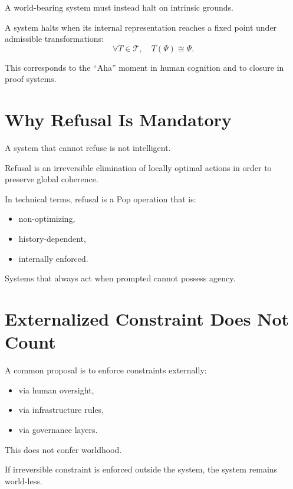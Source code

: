 \documentclass[11pt]{book}
\begin{document}
A world-bearing system must instead halt on intrinsic grounds.

\begin{definition}
A system halts when its internal representation reaches a fixed point
under admissible transformations:
\[
\forall T \in \mathcal{T}, \quad T(\Psi) \cong \Psi.
\]
\end{definition}

This corresponds to the ``Aha'' moment in human cognition and to closure
in proof systems.

\section{Why Refusal Is Mandatory}

A system that cannot refuse is not intelligent.

\begin{definition}[Refusal]
Refusal is an irreversible elimination of locally optimal actions in
order to preserve global coherence.
\end{definition}

In technical terms, refusal is a \textsf{Pop} operation that is:
\begin{itemize}
\item non-optimizing,
\item history-dependent,
\item internally enforced.
\end{itemize}

Systems that always act when prompted cannot possess agency.

\section{Externalized Constraint Does Not Count}

A common proposal is to enforce constraints externally:
\begin{itemize}
\item via human oversight,
\item via infrastructure rules,
\item via governance layers.
\end{itemize}

This does not confer worldhood.

\begin{proposition}
If irreversible constraint is enforced outside the system, the system
remains world-less.
\end{proposition}
\end{document}
